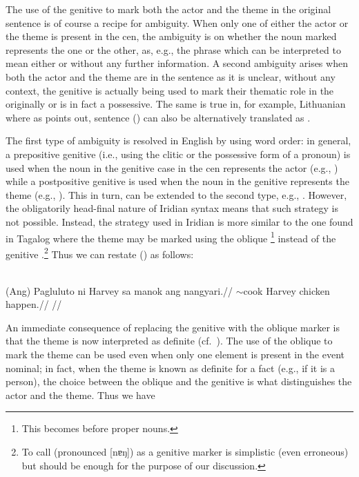 The use of the genitive to mark both the actor and the theme in
the original sentence is of course a recipe for ambiguity. When only one of
either the actor or the theme is present in the {\sc cen}, the ambiguity is on
whether the noun marked represents the one or the other, as, e.g., the phrase
 which can be interpreted to mean either  or  without any further
information. A second ambiguity arises when both the actor and the theme are in
the sentence as it is unclear, without any context, the genitive is actually
being used to mark their thematic role in the originally or is in fact a
possessive. The same is true in, for example, Lithuanian where
as \textcite{serekaite2020} points out, sentence
() can also be alternatively translated as
.

The first type of ambiguity is resolved in English by using word
order: in general, a prepositive genitive (i.e., using the clitic 
or the possessive form of a pronoun) is used when the noun in the genitive case
in the {\sc cen} represents the actor (e.g., ) while a
postpositive genitive is used when the noun in the genitive represents the theme
(e.g., ). This in turn, can be extended to the
second type, e.g., . However, the
obligatorily head-final nature of Iridian syntax means that such strategy is not
possible. Instead, the strategy used in Iridian is more similar to the one found
in Tagalog where the theme may be marked using the oblique
\footnote{This becomes  before proper nouns.} instead
of the genitive .\footnote{ To call  (pronounced [nɐŋ])
as a genitive marker is simplistic (even erroneous) but should be enough for the
purpose of our discussion. } Thus we can restate ()
as follows:

\\
\begingl
    \gla (Ang) Pagluluto ni Harvey {sa} manok ang nangyari.//
    \glb \Nom{} \Ger{}$\sim$cook \Gen{} Harvey \Obl{} chicken \Nom{} happen.\Pfv{}//
    \glft {}//
\endgl
\xe

An immediate consequence of replacing the genitive  with the oblique
marker  is that the theme is now interpreted as definite
(cf.~\cite[3,\,40]{kaufman2009}). The use of the oblique to mark the theme can
be used even when only one element is present in the event nominal; in fact,
when the theme is known as definite for a fact (e.g., if it is a person), the
choice between the oblique and the genitive is what distinguishes the actor and
the theme. Thus we have

